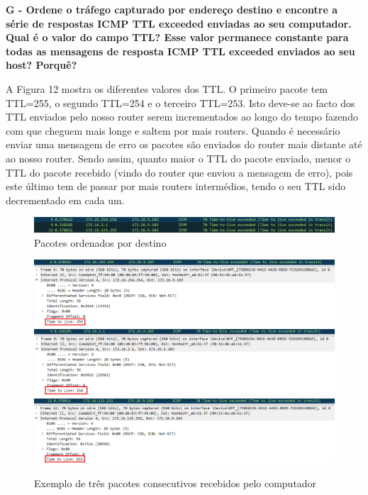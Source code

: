 \documentclass[11pt]{article}
\begin{document}
\clearpage

\textbf{G - Ordene o tráfego capturado por endereço destino e encontre a série de respostas ICMP TTL exceeded enviadas ao seu computador. Qual é o valor do campo TTL? Esse valor permanece constante para todas as mensagens de resposta ICMP TTL exceeded enviados ao seu host? Porquê?}

A Figura 12 mostra os diferentes valores dos TTL. O primeiro pacote tem TTL=255, o segundo TTL=254 e o terceiro TTL=253. Isto deve-se ao facto dos TTL enviados pelo nosso router serem incrementados ao longo do tempo fazendo com que cheguem mais longe e saltem por mais routers. Quando é necessário enviar uma mensagem de erro os pacotes são enviados do router mais distante até ao nosso router. Sendo assim, quanto maior o TTL do pacote enviado, menor o TTL do pacote recebido (vindo do router que enviou a mensagem de erro), pois este último tem de passar por mais routers intermédios, tendo o seu TTL sido decrementado em cada um.

\begin{figure}[hbt!]
    \centering
    \includegraphics[width=\textwidth]{images/parte1/default/pacotes_destination.png}
    \caption{Pacotes ordenados por destino}
\end{figure}

\begin{figure}[hbt!]
        \includegraphics[width=\linewidth]{images/parte1/default/ttl_255.png}
        \centering
        \captionsetup{1º Pacote}
    \endminipage\hfill
        \includegraphics[width=\linewidth]{images/parte1/default/ttl_254.png}
        \centering
        \captionsetup{2º Pacote}
    \endminipage\hfill
        \includegraphics[width=\linewidth]{images/parte1/default/ttl_253.png}
        \centering
        \captionsetup{3º Pacote}
    \endminipage
    \caption{Exemplo de três pacotes consecutivos recebidos pelo computador}
\end{figure}
\end{document}
